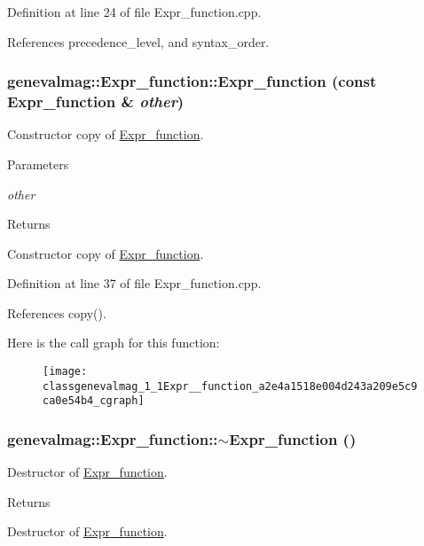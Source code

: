 Definition at line 24 of file Expr\_\-function.cpp.



References precedence\_\-level, and syntax\_\-order.

\hypertarget{classgenevalmag_1_1Expr__function_a2e4a1518e004d243a209e5c9ca0e54b4}{
\subsubsection[{Expr\_\-function}]{\setlength{\rightskip}{0pt plus 5cm}genevalmag::Expr\_\-function::Expr\_\-function (const {\bf Expr\_\-function} \& {\em other})}}
\label{classgenevalmag_1_1Expr__function_a2e4a1518e004d243a209e5c9ca0e54b4}
Constructor copy of \hyperlink{classgenevalmag_1_1Expr__function}{Expr\_\-function}. 
\begin{DoxyParams}{Parameters}
\item[{\em other}]\end{DoxyParams}
\begin{DoxyReturn}{Returns}

\end{DoxyReturn}
Constructor copy of \hyperlink{classgenevalmag_1_1Expr__function}{Expr\_\-function}. 

Definition at line 37 of file Expr\_\-function.cpp.



References copy().



Here is the call graph for this function:\nopagebreak
\begin{figure}[H]
\begin{center}
\leavevmode
\texttt{[image: classgenevalmag\_1\_1Expr\_\_function\_a2e4a1518e004d243a209e5c9ca0e54b4\_cgraph]}
\end{center}
\end{figure}


\hypertarget{classgenevalmag_1_1Expr__function_ae7de6c473686005994a3444e6d953e52}{
\subsubsection[{$\sim$Expr\_\-function}]{\setlength{\rightskip}{0pt plus 5cm}genevalmag::Expr\_\-function::$\sim$Expr\_\-function ()}}
\label{classgenevalmag_1_1Expr__function_ae7de6c473686005994a3444e6d953e52}
Destructor of \hyperlink{classgenevalmag_1_1Expr__function}{Expr\_\-function}. \begin{DoxyReturn}{Returns}

\end{DoxyReturn}
Destructor of \hyperlink{classgenevalmag_1_1Expr__function}{Expr\_\-function}. 

